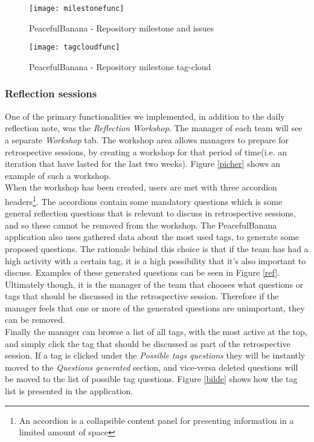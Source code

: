 \begin{figure}[H]
    \centering
        \texttt{[image: milestonefunc]}
    \caption{PeacefulBanana - Repository milestone and issues}
    \label{milestonefunc}
\end{figure}

\begin{figure}[H]
    \centering
        \texttt{[image: tagcloudfunc]}
    \caption{PeacefulBanana - Repository milestone tag-cloud}
    \label{tagcloudfunc}
\end{figure}

\subsubsection{Reflection sessions}
One of the primary functionalities we implemented, in addition to the daily reflection note, was the \emph{Reflection Workshop}. The manager of each team will see a separate \emph{Workshop} tab. The workshop area allows managers to prepare for retrospective sessions, by creating a workshop for that period of time(i.e. an iteration that have lasted for the last two weeks). Figure \ref{picher} shows an example of such a workshop. \\ 
When the workshop has been created, users are met with three accordion headers\footnote{An accordion is a collapsible content panel for presenting information in a limited amount of space}. The accordions contain some mandatory questions which is some general reflection questions that is relevant to discuss in retrospective sessions, and so these cannot be removed from the workshop. The PeacefulBanana application also uses gathered data about the most used tags, to generate some proposed questions. The rationale behind this choice is that if the team has had a high activity with a certain tag, it is a high possibility that it's also important to discuss. Examples of these generated questions can be seen in Figure \ref{ref}. Ultimately though, it is the manager of the team that chooses what questions or tags that should be discussed in the retrospective session. Therefore if the manager feels that one or more of the generated questions are unimportant, they can be removed. \\
Finally the manager can browse a list of all tags, with the most active at the top, and simply click the tag that should be discussed as part of the retrospective session. If a tag is clicked under the \emph{Possible tags questions} they will be instantly moved to the \emph{Questions generated} section, and vice-versa deleted questions will be moved to the list of possible tag questions. Figure \ref{bilde} shows how the tag list is presented in the application. 

